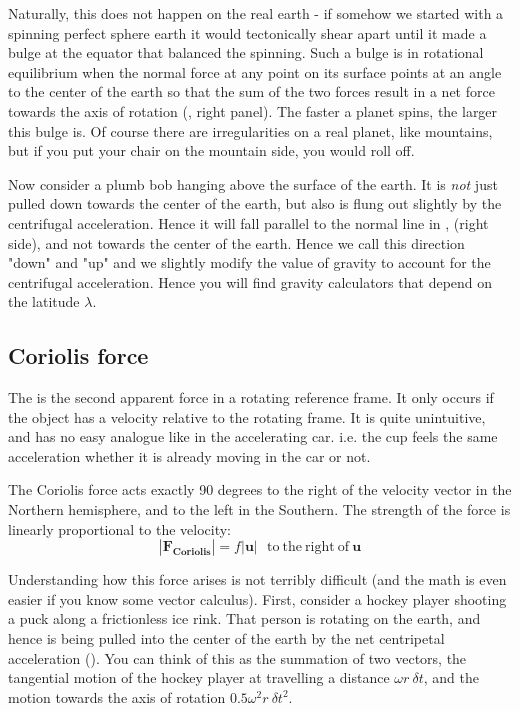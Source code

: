 Naturally, this does not happen on the real earth - if somehow we started with a spinning perfect sphere earth it would tectonically shear apart until it made a bulge at the equator that balanced the spinning.  Such a  bulge is in rotational equilibrium when the normal force at any point on its surface points at an angle to the center of the earth so that the sum of the two forces result in a net force towards the axis of rotation (, right panel). The faster a planet spins, the larger this bulge is.  Of course there are irregularities on a real planet, like mountains, but if you put your chair on the mountain side, you would roll off.  

Now consider a plumb bob hanging above the surface of the earth.  It is \emph{not} just pulled down towards the center of the earth, but also is flung out slightly by the centrifugal acceleration. Hence it will fall parallel to the normal line in , (right side), and not towards the center of the earth. Hence we call this direction "down" and "up" and we slightly modify the value of gravity to account for the centrifugal acceleration.  Hence you will find gravity calculators that depend on the latitude $\lambda$.  

\subsection{Coriolis force}

The  is the second apparent force in a rotating reference frame.  It only occurs if the object has a velocity relative to the rotating frame. It is quite unintuitive, and has no easy analogue like in the accelerating car.  i.e. the cup feels the same acceleration whether it is already moving in the car or not.  

The Coriolis force acts exactly 90 degrees to the right of the velocity vector in the Northern hemisphere, and to the left in the Southern. The strength of the force is linearly proportional to the velocity: 
\begin{equation}
    |\mathbf{F_{Coriolis}}| = f |\mathbf{u}| \ \ \ \mathrm{to\ the\ right\ of\ \mathbf{u}} 
\end{equation}

Understanding how this force arises is not terribly difficult (and the math is even easier if you know some vector calculus).  First, consider a hockey player shooting a puck along a frictionless ice rink.  That person is rotating on the earth, and hence is being pulled into the center of the earth by the net centripetal acceleration ().  You can think of this as the summation of two vectors, the tangential motion of the hockey player at travelling a distance $\omega r\ \delta t$, and the motion towards the axis of rotation $0.5\omega^2 r \ \delta t^2$.  

